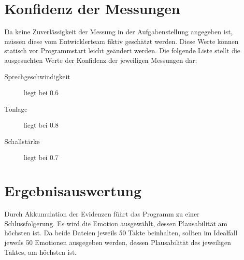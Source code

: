 \section{Konfidenz der Messungen}
Da keine Zuverlässigkeit der Messung in der Aufgabenstellung angegeben ist, müssen diese vom Entwicklerteam fiktiv geschätzt werden. Diese Werte können statisch vor Programmstart leicht geändert werden. Die folgende Liste stellt die ausgesuchten Werte der Konfidenz der jeweiligen Messungen dar:
\begin{description}
\item [Sprechgeschwindigkeit] liegt bei 0.6
\item [Tonlage] liegt bei 0.8
\item [Schallstärke] liegt bei 0.7
\end{description}


\section{Ergebnisauswertung}
Durch Akkumulation der Evidenzen führt das Programm zu einer Schlussfolgerung. Es wird die Emotion ausgewählt, dessen Plausabilität am höchsten ist. Da beide Dateien jeweils 50 Takte beinhalten, sollten im Idealfall jeweils 50 Emotionen ausgegeben werden, dessen Plausabilität des jeweiligen Taktes, am höchsten ist.



